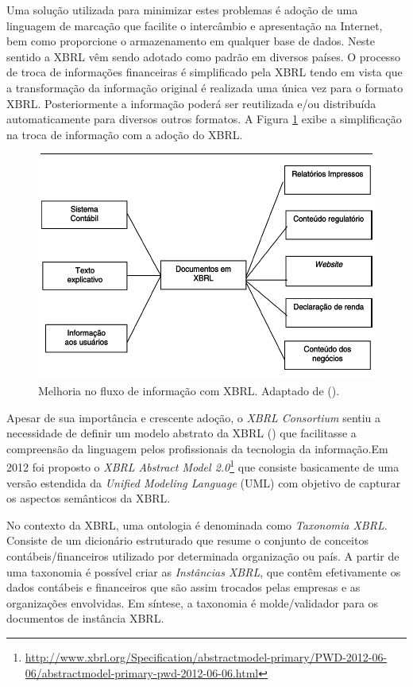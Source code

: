 \documentclass[msc,proposal,hidelot,hideabstract]{ppgccufmg} %
\begin{document}
Uma solução utilizada para minimizar estes problemas é adoção de uma linguagem de marcação que facilite o intercâmbio e apresentação na Internet, bem como proporcione o armazenamento em qualquer base de dados. Neste sentido a XBRL vêm sendo adotado como padrão em diversos países. O processo de troca de informações financeiras é simplificado pela XBRL tendo em vista que a transformação da informação original é realizada uma única vez para o formato XBRL. Posteriormente a informação poderá ser reutilizada e/ou distribuída automaticamente para diversos outros formatos. A Figura \ref{fig:fluxo_info_xbrl} exibe a simplificação na troca de informação com a adoção do XBRL.

\begin{figure}[hbtp]
\centering
\includegraphics[width=.75\textwidth]{../img/fluxo_info_xbrl.png}
\caption{Melhoria no fluxo de informação com XBRL. Adaptado de (\cite{hoffman2001xbrl}).}
\label{fig:fluxo_info_xbrl}
\end{figure}

Apesar de sua importância e crescente adoção, o \textit{XBRL Consortium} sentiu a necessidade de definir um modelo abstrato da XBRL (\cite{xbrl_preserve_promote_particite}) que facilitasse a compreensão da linguagem pelos profissionais da tecnologia da informação.Em 2012 foi proposto o \textit{XBRL Abstract Model 2.0}\footnote{\url{http://www.xbrl.org/Specification/abstractmodel-primary/PWD-2012-06-06/abstractmodel-primary-pwd-2012-06-06.html}} que consiste basicamente de uma versão estendida da \textit{Unified Modeling Language} (UML)\cite{booch2000uml} com objetivo de capturar os aspectos semânticos da XBRL.

No contexto da XBRL, uma ontologia é denominada como \textit{Taxonomia XBRL}{}. Consiste de um dicionário estruturado que resume o conjunto de conceitos contábeis/financeiros utilizado por determinada organização ou país. A partir de uma taxonomia é possível criar as \textit{Instâncias XBRL}, que contêm efetivamente os dados contábeis e financeiros que são assim trocados pelas empresas e as organizações envolvidas. Em síntese, a taxonomia é molde/validador para os documentos de instância XBRL.
\end{document}
